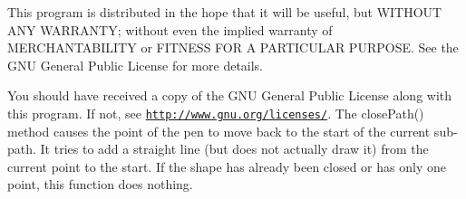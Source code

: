 This program is distributed in the hope that it will be useful, but W\+I\+T\+H\+O\+U\+T A\+N\+Y W\+A\+R\+R\+A\+N\+T\+Y; without even the implied warranty of M\+E\+R\+C\+H\+A\+N\+T\+A\+B\+I\+L\+I\+T\+Y or F\+I\+T\+N\+E\+S\+S F\+O\+R A P\+A\+R\+T\+I\+C\+U\+L\+A\+R P\+U\+R\+P\+O\+S\+E. See the G\+N\+U General Public License for more details.

You should have received a copy of the G\+N\+U General Public License along with this program. If not, see \href{http://www.gnu.org/licenses/}{\tt http\+://www.\+gnu.\+org/licenses/}. The close\+Path() method causes the point of the pen to move back to the start of the current sub-\/path. It tries to add a straight line (but does not actually draw it) from the current point to the start. If the shape has already been closed or has only one point, this function does nothing. 